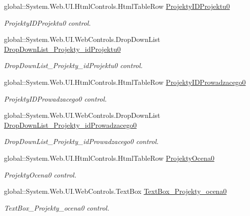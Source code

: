 \begin{DoxyCompactItemize}
global\+::\+System.\+Web.\+U\+I.\+Html\+Controls.\+Html\+Table\+Row \hyperlink{class_dziennik_ocen_web2_1_1_web_form1_a2c3f09e98eb048a17c692bf0589e5035}{Projekty\+I\+D\+Projektu0}
\begin{DoxyCompactList}\small\item\em Projekty\+I\+D\+Projektu0 control. \end{DoxyCompactList}\item 
global\+::\+System.\+Web.\+U\+I.\+Web\+Controls.\+Drop\+Down\+List \hyperlink{class_dziennik_ocen_web2_1_1_web_form1_a533bb90bea691dda0884d9d977e0af55}{Drop\+Down\+List\+\_\+\+Projekty\+\_\+id\+Projektu0}
\begin{DoxyCompactList}\small\item\em Drop\+Down\+List\+\_\+\+Projekty\+\_\+id\+Projektu0 control. \end{DoxyCompactList}\item 
global\+::\+System.\+Web.\+U\+I.\+Html\+Controls.\+Html\+Table\+Row \hyperlink{class_dziennik_ocen_web2_1_1_web_form1_a2cf2d616a26c3cc1b02d3e0b8aa47690}{Projekty\+I\+D\+Prowadzacego0}
\begin{DoxyCompactList}\small\item\em Projekty\+I\+D\+Prowadzacego0 control. \end{DoxyCompactList}\item 
global\+::\+System.\+Web.\+U\+I.\+Web\+Controls.\+Drop\+Down\+List \hyperlink{class_dziennik_ocen_web2_1_1_web_form1_a48e6225cc66d43f62efa99625485d3db}{Drop\+Down\+List\+\_\+\+Projekty\+\_\+id\+Prowadzacego0}
\begin{DoxyCompactList}\small\item\em Drop\+Down\+List\+\_\+\+Projekty\+\_\+id\+Prowadzacego0 control. \end{DoxyCompactList}\item 
global\+::\+System.\+Web.\+U\+I.\+Html\+Controls.\+Html\+Table\+Row \hyperlink{class_dziennik_ocen_web2_1_1_web_form1_a55cb47e538e27de5daac8a1f325eed64}{Projekty\+Ocena0}
\begin{DoxyCompactList}\small\item\em Projekty\+Ocena0 control. \end{DoxyCompactList}\item 
global\+::\+System.\+Web.\+U\+I.\+Web\+Controls.\+Text\+Box \hyperlink{class_dziennik_ocen_web2_1_1_web_form1_a5a77cbbbe25b39b4f8a5639be94ac841}{Text\+Box\+\_\+\+Projekty\+\_\+ocena0}
\begin{DoxyCompactList}\small\item\em Text\+Box\+\_\+\+Projekty\+\_\+ocena0 control. \end{DoxyCompactList}\item 

\end{DoxyCompactItemize}
